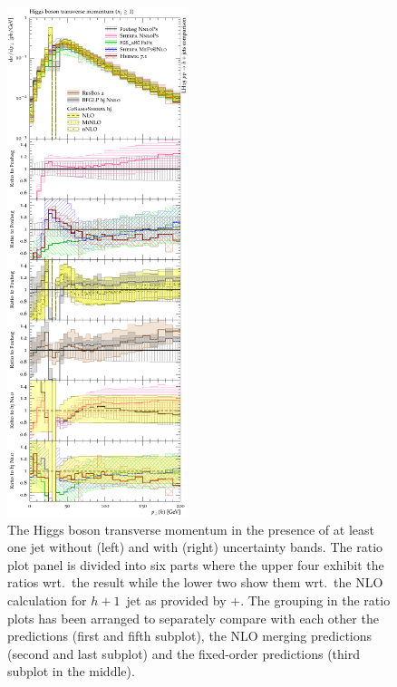 \begin{figure}[p!]
  \includegraphics[width=0.47\textwidth]{figures/hjetscomp_H_j_pT_incl.pdf}
  \caption{\label{fig:hjetscomp:results:1obs:hpt}%
    The Higgs boson transverse momentum in the presence of at least
    one jet without (left) and with (right) uncertainty bands. The
    ratio plot panel is divided into six parts where the upper four
    exhibit the ratios wrt.~the \hjetscompPowheg \hjetscompNNLOPS result while the lower
    two show them wrt.~the NLO calculation for $h+1$~jet as
    provided by \hjetscompGoSam{}+\hjetscompSherpa. The grouping in the ratio plots has
    been arranged to separately compare with each other the \hjetscompNNLOPS
    predictions (first and fifth subplot), the NLO merging
    predictions (second and last subplot) and the fixed-order
    predictions (third subplot in the middle).}
\end{figure}

